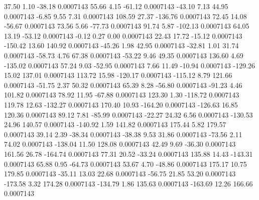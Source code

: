        37.50        1.10      -38.18     0.0007143
       55.66        4.15      -61.12     0.0007143
      -43.10        7.13       44.95     0.0007143
       -6.85        9.55        7.31     0.0007143
      108.59       27.37     -136.76     0.0007143
       72.45       14.08      -56.67     0.0007143
       73.56        5.66      -77.73     0.0007143
       91.74        5.87     -102.13     0.0007143
       64.05       13.19      -53.12     0.0007143
       -0.12        0.27        0.00     0.0007143
       22.43       17.72      -15.12     0.0007143
     -150.42       13.60      140.92     0.0007143
      -45.26        1.98       42.95     0.0007143
      -32.81        1.01       31.74     0.0007143
      -58.73        4.76       67.38     0.0007143
      -53.22        9.46       49.35     0.0007143
      136.60        4.69     -135.02     0.0007143
       57.24        9.03      -52.95     0.0007143
        7.66       11.49      -10.94     0.0007143
     -129.26       15.02      137.01     0.0007143
      113.72       15.98     -120.17     0.0007143
     -115.12        8.79      121.66     0.0007143
      -51.75        2.37       50.32     0.0007143
       65.39        8.28      -56.80     0.0007143
      -91.23        4.46      101.82     0.0007143
       78.92       11.95      -67.88     0.0007143
      123.30        1.30     -118.72     0.0007143
      119.78       12.63     -132.27     0.0007143
      170.40       10.93     -164.20     0.0007143
     -126.63       16.85      120.36     0.0007143
       89.12        7.81      -85.99     0.0007143
      -22.27       24.32        6.56     0.0007143
     -130.53       24.96      140.57     0.0007143
     -140.92        1.59      141.82     0.0007143
      175.44        5.82      179.57     0.0007143
       39.14        2.39      -38.34     0.0007143
      -38.38        9.53       31.86     0.0007143
      -73.56        2.11       74.02     0.0007143
     -138.04       11.50      128.08     0.0007143
       42.49        9.69      -36.30     0.0007143
      161.56       26.78     -164.74     0.0007143
       77.31       20.52      -33.24     0.0007143
      135.88       14.43     -143.31     0.0007143
       65.88        0.95      -64.73     0.0007143
       53.67        4.70      -48.86     0.0007143
      175.17       10.75      179.85     0.0007143
      -35.11       13.03       22.68     0.0007143
      -56.75       21.85       53.20     0.0007143
     -173.58        3.32      174.28     0.0007143
     -134.79        1.86      135.63     0.0007143
     -163.69       12.26      166.66     0.0007143
